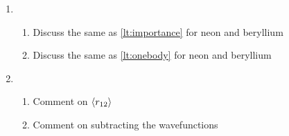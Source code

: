 \documentclass[11pt]{article}
\begin{document}
\begin{enumerate}
\item
	\begin{enumerate}
		\item Discuss the same as \ref{lt:importance} for neon and beryllium
		\item Discuss the same as \ref{lt:onebody} for neon and beryllium
	\end{enumerate}


\item 
	\begin{enumerate}
		\item Comment on \(\expval{r_{12}}\)
		\item Comment on subtracting the wavefunctions
	\end{enumerate}
\end{enumerate}








\end{document}
